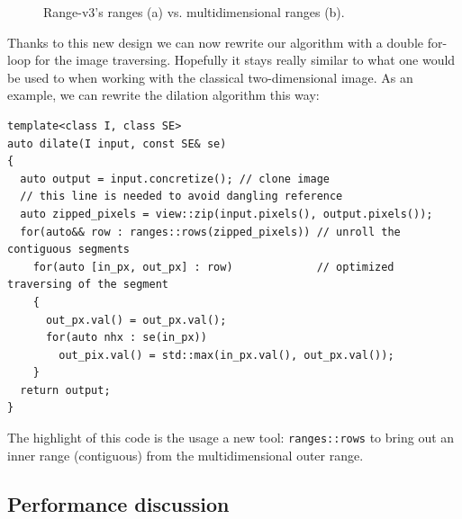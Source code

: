 \begin{figure}[htbp]
  \centering
  \caption{Range-v3's ranges (a) vs. multidimensional ranges (b).}
  \label{fig:inner.outer.range}
\end{figure}

Thanks to this new design we can now rewrite our algorithm with a double for-loop for the image traversing. Hopefully it
stays really similar to what one would be used to when working with the classical two-dimensional image. As an example,
we can rewrite the dilation algorithm this way:
\begin{verbatim}
template<class I, class SE>
auto dilate(I input, const SE& se)
{
  auto output = input.concretize(); // clone image
  // this line is needed to avoid dangling reference
  auto zipped_pixels = view::zip(input.pixels(), output.pixels());
  for(auto&& row : ranges::rows(zipped_pixels)) // unroll the contiguous segments
    for(auto [in_px, out_px] : row)             // optimized traversing of the segment
    {
      out_px.val() = out_px.val();
      for(auto nhx : se(in_px))
        out_pix.val() = std::max(in_px.val(), out_px.val());
    }
  return output;
}
\end{verbatim}

The highlight of this code is the usage a new tool: \texttt{ranges::rows} to bring out an inner range (contiguous) from
the multidimensional outer range.

\subsection{Performance discussion}

